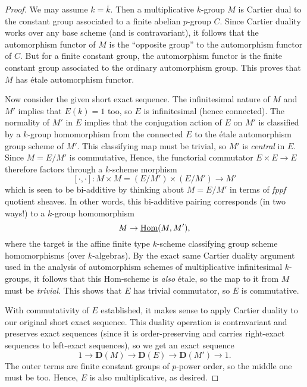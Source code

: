 \documentclass[10pt]{article}
\renewcommand{\(}{\left(}
\renewcommand{\)}{\right)}
\numberwithin{thm}{subsection}
\begin{document}
\begin{proof}
We may assume $k = \overline{k}$.  Then a multiplicative $k$-group $M$ is
Cartier dual to the constant group associated to a finite abelian $p$-group $C$.
Since Cartier duality works over any base scheme (and is contravariant), it follows that the automorphism
functor of $M$ is the ``opposite group'' to the automorphism functor of $C$.
But for a finite constant group, the automorphism functor is the finite
constant group associated to the ordinary automorphism group.  This proves
that $M$ has \'etale automorphism functor.

Now consider the given short exact sequence.   The infinitesimal nature of
$M$ and $M'$ implies that $E(k) = 1$ too, so $E$ is infinitesimal (hence connected).
The normality of $M'$ in $E$ implies that the conjugation action of $E$ on $M'$
is classified by a $k$-group homomorphism from the connected 
$E$ to the \'etale automorphism group scheme of $M'$.
This classifying map must be trivial, so $M'$ is {\em central} in $E$. 
Since $M = E/M'$ is commutative, 
Hence, the functorial commutator $E \times E \rightarrow E$ therefore
factors through a $k$-scheme morphism
$$[\cdot,\cdot]:M \times M = (E/M') \times (E/M') \rightarrow M'$$
which is seen to be bi-additive by thinking about $M = E/M'$ 
in terms of {\em fppf} quotient sheaves.  In other words, this bi-additive
pairing corresponds (in two ways!) to a $k$-group homomorphism
$$M \rightarrow \underline{\rm{Hom}}(M,M'),$$
where the target is the affine finite type $k$-scheme classifying group scheme homomorphisms
(over $k$-algebras).  By the exact same Cartier duality argument
used in the analysis of automorphism schemes of multiplicative infinitesimal $k$-groups,
it follows that this Hom-scheme is {\em also} \'etale, so 
the map to it from $M$ must be {\em trivial}.  This shows that $E$ has trivial
commutator, so $E$ is commutative. 

With commutativity of $E$ established, it makes sense to apply Cartier duality to our original
short exact sequence.  This duality operation is contravariant and preserves exact sequences
(since it is order-preserving and carries right-exact sequences to left-exact sequences), 
so we get an exact sequence
$$1 \rightarrow \mathbf{D}(M) \rightarrow \mathbf{D}(E) \rightarrow \mathbf{D}(M') \rightarrow 1.$$
The outer terms are finite constant groups of $p$-power order, so the middle one must be too.
Hence, $E$ is also multiplicative, as desired.
\end{proof}
\end{document}
